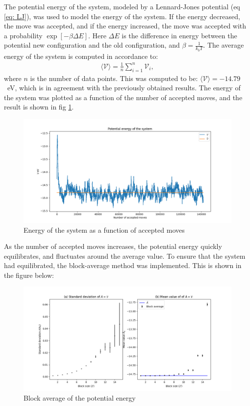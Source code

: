 \documentclass[a4paper]{article}
\newcommand{\newparagraph}{\vspace{.5cm}\noindent}
\newcommand{\average}[1]{\langle #1 \rangle}
\begin{document}
\newparagraph
The potential energy of the system, modeled by a Lennard-Jones potential (eq \eqref{eq: LJ}), was used to model the energy of the system. If the energy decreased, the move was accepted, and if the energy increased, the move was accepted with a probability $\exp\left[-\beta\Delta E\right]$.
Here $\Delta E$ is the difference in energy between the potential new configuration and the old configuration, and $\beta = \frac{1}{k_bT}$.
The average energy of the system is computed in accordance to:
\begin{align*}
    \average{\mathcal{V}} = \frac{1}{n}\sum_{i=1}^n \mathcal{V}_i,
\end{align*}where $n$ is the number of data points. This was computed to be: $\average{\mathcal{V}} = - 14.79$~eV, which is in agreement with the previously obtained results.
The energy of the system was plotted as a function of the number of accepted moves, and the result is shown in fig \ref{fig: energy}.
\begin{figure}[H]
    \centering
    \includegraphics[scale = 0.45]{potential_energy.png}
    \caption{Energy of the system as a function of accepted moves}
    \label{fig: energy}
\end{figure}\noindent
As the number of accepted moves increases, the potential energy quickly equilibrates, and fluctuates around the average value.
To ensure that the system had equilibrated, the block-average method was implemented. This is shown in the figure below:
\begin{figure}[H]
    \centering
    \includegraphics[scale = 0.4]{var_p.png}
    \caption{Block average of the potential energy}
    \label{fig: block average potential}
\end{figure}\noindent
\end{document}
